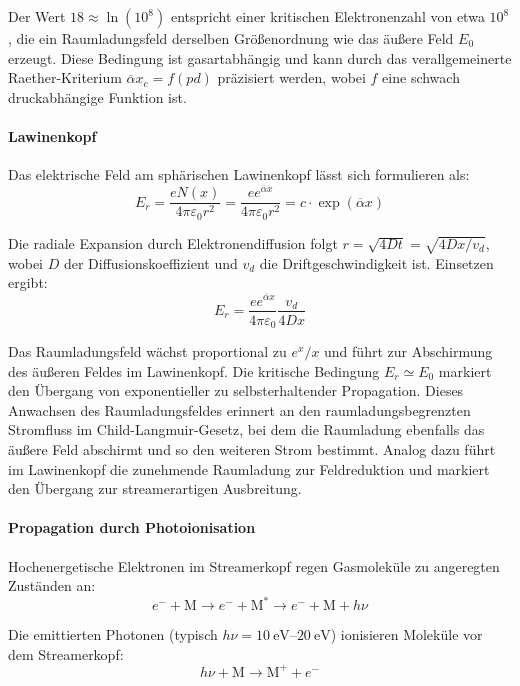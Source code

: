Der Wert $18 \approx \ln(10^8)$ entspricht einer kritischen Elektronenzahl von etwa $10^8$, die ein Raumladungsfeld derselben Größenordnung wie das äußere Feld $E_0$ erzeugt. Diese Bedingung ist gasartabhängig und kann durch das verallgemeinerte Raether-Kriterium $\overline{\alpha} x_c = f(pd)$ präzisiert werden, wobei $f$ eine schwach druckabhängige Funktion ist.


\paragraph{Lawinenkopf}
Das elektrische Feld am sphärischen Lawinenkopf lässt sich formulieren als:
\begin{equation}
  E_r = \frac{e N(x)}{4\pi \varepsilon_0 r^2} = \frac{e e^{\overline{\alpha}x}}{4\pi \varepsilon_0 r^2} = c \cdot \exp(\overline{\alpha} x)
    \label{eq:electronlawfield}
\end{equation}

Die radiale Expansion durch Elektronendiffusion folgt $r = \sqrt{4Dt} = \sqrt{4Dx/v_d}$, wobei $D$ der Diffusionskoeffizient und $v_d$ die Driftgeschwindigkeit ist. Einsetzen ergibt:
\begin{equation}
    E_r = \frac{e e^{\overline{\alpha}x}}{4\pi \varepsilon_0} \frac{v_d}{4Dx}
    \label{eq:electronlawfielddif}
\end{equation}

Das Raumladungsfeld wächst proportional zu $e^x/x$ und führt zur Abschirmung des äußeren Feldes im Lawinenkopf. Die kritische Bedingung $E_r \simeq E_0$ markiert den Übergang von exponentieller zu selbsterhaltender Propagation.
Dieses Anwachsen des Raumladungsfeldes erinnert an den raumladungsbegrenzten Stromfluss im Child-Langmuir-Gesetz, bei dem die Raumladung ebenfalls das äußere Feld abschirmt und so den weiteren Strom bestimmt. Analog dazu führt im Lawinenkopf die zunehmende Raumladung zur Feldreduktion und markiert den Übergang zur streamerartigen Ausbreitung.


\paragraph{Propagation durch Photoionisation}
Hochenergetische Elektronen im Streamerkopf regen Gasmoleküle zu angeregten Zuständen an:
\begin{equation}
    e^- + \text{M} \rightarrow e^- + \text{M}^* \rightarrow e^- + \text{M} + h\nu
\end{equation}

Die emittierten Photonen (typisch $h\nu = \SIrange{10}{20}{\electronvolt}$) ionisieren Moleküle vor dem Streamerkopf:
\begin{equation}
    h\nu + \text{M} \rightarrow \text{M}^+ + e^-
\end{equation}

